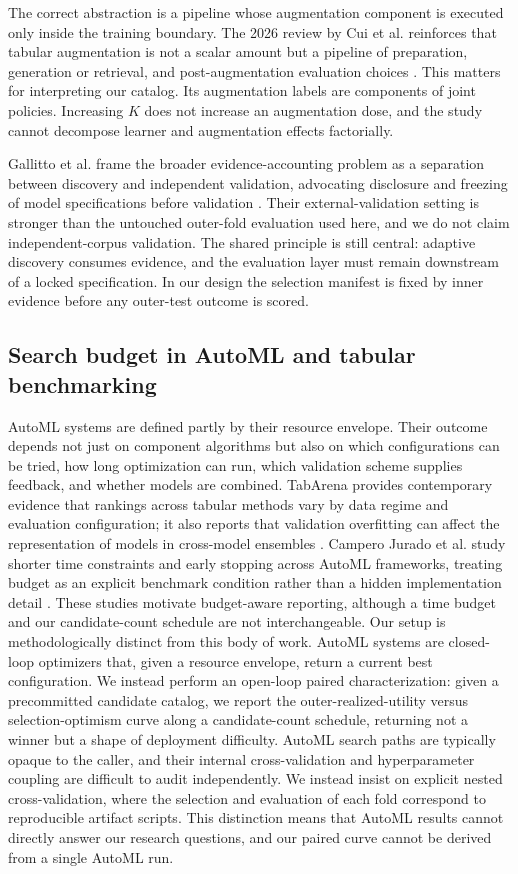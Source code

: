 \documentclass[referee]{USG}
\begin{document}
The correct abstraction is a pipeline whose augmentation component is executed only inside the training boundary. The 2026 review by Cui et al. reinforces that tabular augmentation is not a scalar amount but a pipeline of preparation, generation or retrieval, and post-augmentation evaluation choices \cite{cui2026augmentation}. This matters for interpreting our catalog. Its augmentation labels are components of joint policies. Increasing $K$ does not increase an augmentation dose, and the study cannot decompose learner and augmentation effects factorially.

Gallitto et al. frame the broader evidence-accounting problem as a separation between discovery and independent validation, advocating disclosure and freezing of model specifications before validation \cite{gallitto2025external}. Their external-validation setting is stronger than the untouched outer-fold evaluation used here, and we do not claim independent-corpus validation. The shared principle is still central: adaptive discovery consumes evidence, and the evaluation layer must remain downstream of a locked specification. In our design the selection manifest is fixed by inner evidence before any outer-test outcome is scored.

\subsection{Search budget in AutoML and tabular benchmarking}
AutoML systems are defined partly by their resource envelope. Their outcome depends not just on component algorithms but also on which configurations can be tried, how long optimization can run, which validation scheme supplies feedback, and whether models are combined. TabArena provides contemporary evidence that rankings across tabular methods vary by data regime and evaluation configuration; it also reports that validation overfitting can affect the representation of models in cross-model ensembles \cite{erickson2025tabarena}. Campero Jurado et al. study shorter time constraints and early stopping across AutoML frameworks, treating budget as an explicit benchmark condition rather than a hidden implementation detail \cite{camperojurado2025automl}. These studies motivate budget-aware reporting, although a time budget and our candidate-count schedule are not interchangeable. Our setup is methodologically distinct from this body of work. AutoML systems are closed-loop optimizers that, given a resource envelope, return a current best configuration. We instead perform an open-loop paired characterization: given a precommitted candidate catalog, we report the outer-realized-utility versus selection-optimism curve along a candidate-count schedule, returning not a winner but a shape of deployment difficulty. AutoML search paths are typically opaque to the caller, and their internal cross-validation and hyperparameter coupling are difficult to audit independently. We instead insist on explicit nested cross-validation, where the selection and evaluation of each fold correspond to reproducible artifact scripts. This distinction means that AutoML results cannot directly answer our research questions, and our paired curve cannot be derived from a single AutoML run.
\end{document}
